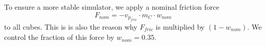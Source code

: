 To ensure a more stable simulator, we apply a nominal friction force
\begin{equation}
F_\textit{nom} = -v_{p_\textit{fric}} \cdot m_C \cdot w_\textit{nom}
\end{equation}
to all cubes.
This is is also the reason why $F_\textit{fric}$ is multiplied by $(1 - w_\textit{nom})$.
We control the fraction of this force by $w_\textit{nom} = 0.35$.


